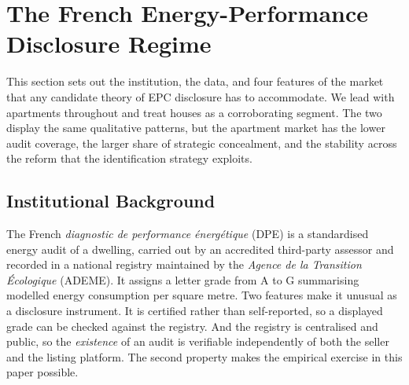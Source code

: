 %

\section{The French Energy-Performance Disclosure Regime}
\label{sec:setting}

This section sets out the institution, the data, and four features of the market that any
candidate theory of EPC disclosure has to accommodate. We lead with apartments throughout and
treat houses as a corroborating segment. The two display the same qualitative patterns, but the
apartment market has the lower audit coverage, the larger share of strategic concealment, and the
stability across the reform that the identification strategy exploits.

\subsection{Institutional Background}
\label{ss:institutions}

The French \emph{diagnostic de performance \'energ\'etique} (DPE) is a standardised energy audit of
a dwelling, carried out by an accredited third-party assessor and recorded in a national registry
maintained by the \emph{Agence de la Transition \'Ecologique} (ADEME). It assigns a letter grade
from A to G summarising modelled energy consumption per square metre. Two features make it
unusual as a disclosure instrument. It is certified rather than self-reported, so a displayed
grade can be checked against the registry. And the registry is centralised and public, so the
\emph{existence} of an audit is verifiable independently of both the seller and the listing
platform. The second property makes the empirical exercise in this paper possible.

